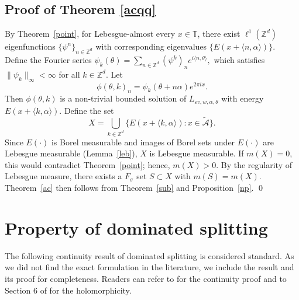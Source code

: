 \documentclass[11pt]{amsart}
\theoremstyle{remark}
\theoremstyle{definition}
\begin{document}
    

\subsection{Proof of Theorem \ref{acqq}}
By Theorem~\ref{point}, for Lebesgue-almost every \( x \in \mathbb{T} \), there exist \(\ell^1(\mathbb{Z}^d)\) eigenfunctions \(\{\psi^n\}_{n \in \mathbb{Z}^d}\) with corresponding eigenvalues \(\{E(x + \langle n, \alpha \rangle)\}\). Define the Fourier series $
\psi_k(\theta) = \sum_{n \in \mathbb{Z}^d} (\psi^k)_n e^{i\langle n, \theta \rangle},
$
which satisfies \(\|\psi_k\|_\infty < \infty\) for all \(k \in \mathbb{Z}^d\). Let
\[
\phi(\theta, k)_n = \psi_k(\theta + n\alpha)e^{2\pi i x}.
\]
Then \(\phi(\theta, k)\) is a non-trivial bounded solution of \({L}_{\varepsilon v,w,\alpha,\theta}\) with energy \(E(x + \langle k, \alpha \rangle)\).
Define the set
\[
X = \bigcup_{k \in \mathbb{Z}^d} \big\{E(x + \langle k, \alpha \rangle) : x \in \tilde{\mathcal{A}} \big\}.
\]
Since \(E(\cdot)\) is Borel measurable and images of Borel sets under \(E(\cdot)\) are Lebesgue measurable (Lemma~\ref{leb}), \(X\) is Lebesgue measurable. If \(m(X) = 0\), this would contradict Theorem~\ref{point}; hence, \(m(X) > 0\). By the regularity of Lebesgue measure, there exists a \(F_\sigma\) set \(S \subset X\) with \(m(S) = m(X)\). Theorem~\ref{ac} then follows from Theorem~\ref{sub} and Proposition~\ref{np}.
\qed


\appendix
\section{Property of dominated splitting}\label{ds-con}

The following continuity result of dominated splitting is considered standard. As we did not find the exact formulation in the literature, we include the result and its proof for completeness. Readers can refer to \cite{CP} for the continuity proof and to Section 6 of \cite{AJS} for the holomorphicity.
\end{document}
